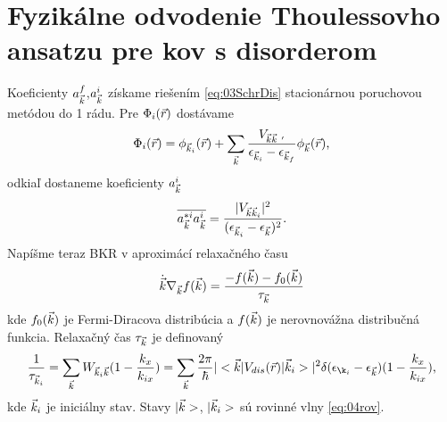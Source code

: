 \section{Fyzikálne odvodenie Thoulessovho ansatzu pre kov s disorderom}
Koeficienty $a^f_{\vec{k}}$,$a^i_{\vec{k}}$ získame riešením \eqref{eq:03SchrDis} stacionárnou poruchovou metódou do 1 rádu. Pre $\Phi_i(\vec{r})$ dostávame
\begin{align}
\Phi_i(\vr)=\phi_{\vk_i}(\vr)+\sum_{\vk}\frac{V_{\vk\vk\ '}}{\epsilon_{\vk_i}-\epsilon_{\vk_f}}\phi_{\vk}(\vr)\text{,}
\end{align}
odkiaľ dostaneme koeficienty $a^i_{\vec{k}}$
\begin{align}
\label{eq:04coef}
\overline{a^{*i}_{\vec{k}}a^i_{\vec{k}}}=\frac{|V_{\vec{k}\vec{k}_i}|^2}{(\epsilon_{\vec{k}_i}-\epsilon_{\vec{k}})^2}\text{.}
\end{align}
Napíšme teraz BKR v aproximácí relaxačného času 
\begin{align}
\dot{\vec{k}}\nabla_{\vec{k}}f(\vec{k})=\frac{-f(\vec{k})-f_0(\vec{k})}{\tau_{\vec{k}}}
\end{align}
kde $f_0(\vec{k})$ je Fermi-Diracova distribúcia a $f(\vec{k})$ je nerovnovážna distribučná funkcia. Relaxačný čas  $\tau_{\vec{k}}$ je definovaný
\begin{align}
\label{eq:04goldenrule}
\frac{1}{\tau_{\vk_i}}=\sum_{\vk}W_{\vk_i\vk}(1-\frac{k_x}{k_{ix}}) = \sum_{\vk}\frac{2\pi}{\hbar}|\bra{\vk}V_{dis}(\vr)\ket{\vk_i}|^2\delta(\epsilon_{\k_i}-\epsilon_{\vk})(1-\frac{k_x}{k_{ix}}) \text{,}
\end{align}
kde $\vec{k}_i$ je iniciálny stav. Stavy $|\vec{k}>$, $|\vec{k}_i>$ sú rovinné vlny \eqref{eq:04rov}.

